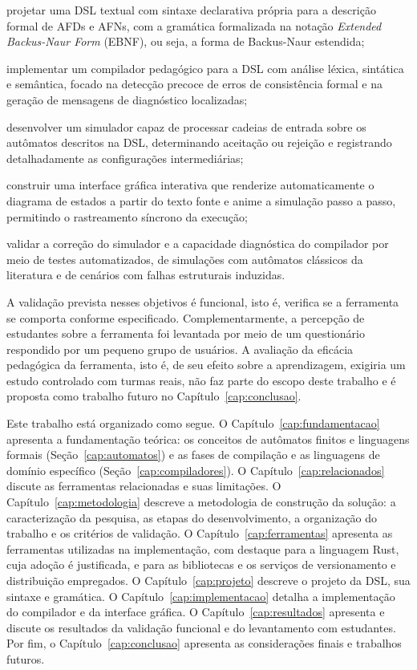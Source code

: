 \documentclass[
    12pt
    ,oneside
    ,a4paper
    ,chapter=TITLE
    ,section=TITLE
    ,sumario=abnt-6027-2012]{abntex2}
\begin{document}
\begin{alineas}
    \item projetar uma DSL textual com sintaxe declarativa própria para a descrição formal de AFDs e
    AFNs, com a gramática formalizada na notação \textit{Extended Backus-Naur Form}
    (EBNF), ou seja, a forma de Backus-Naur estendida;
    \item implementar um compilador pedagógico para a DSL com análise léxica, sintática e semântica,
    focado na detecção precoce de erros de consistência formal e na geração de mensagens de diagnóstico localizadas;
    \item desenvolver um simulador capaz de processar cadeias de entrada sobre os autômatos
    descritos na DSL, determinando aceitação ou rejeição e registrando detalhadamente as configurações intermediárias;
    \item construir uma interface gráfica interativa que renderize automaticamente o diagrama de estados a partir do 
    texto fonte e anime a simulação passo a passo, permitindo o rastreamento síncrono da execução;
    \item validar a correção do simulador e a capacidade diagnóstica do compilador por meio de
    testes automatizados, de simulações com autômatos clássicos da literatura e de cenários
    com falhas estruturais induzidas.
\end{alineas}

A validação prevista nesses objetivos é funcional, isto é, verifica se a ferramenta se
comporta conforme especificado. Complementarmente, a percepção de estudantes sobre a
ferramenta foi levantada por meio de um questionário respondido por um pequeno grupo de
usuários. A avaliação da eficácia pedagógica da ferramenta, isto é, de seu efeito sobre a
aprendizagem, exigiria um estudo controlado com turmas reais, não faz parte do escopo deste
trabalho e é proposta como trabalho futuro no Capítulo~\ref{cap:conclusao}.

Este trabalho está organizado como segue.
O Capítulo~\ref{cap:fundamentacao} apresenta a fundamentação teórica: os conceitos de autômatos finitos e linguagens formais (Seção~\ref{cap:automatos}) e as fases de compilação e as linguagens de domínio específico (Seção~\ref{cap:compiladores}).
O Capítulo~\ref{cap:relacionados} discute as ferramentas relacionadas e suas limitações.
O Capítulo~\ref{cap:metodologia} descreve a metodologia de construção da solução: a caracterização da pesquisa, as etapas do desenvolvimento, a organização do trabalho e os critérios de validação.
O Capítulo~\ref{cap:ferramentas} apresenta as ferramentas utilizadas na implementação, com destaque para a linguagem Rust, cuja adoção é justificada, e para as bibliotecas e os serviços de versionamento e distribuição empregados.
O Capítulo~\ref{cap:projeto} descreve o projeto da DSL, sua sintaxe e gramática.
O Capítulo~\ref{cap:implementacao} detalha a implementação do compilador e da interface gráfica.
O Capítulo~\ref{cap:resultados} apresenta e discute os resultados da validação funcional e do levantamento com estudantes.
Por fim, o Capítulo~\ref{cap:conclusao} apresenta as considerações finais e trabalhos futuros.
\end{document}
